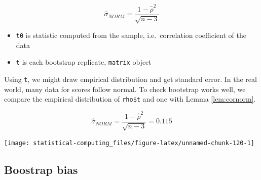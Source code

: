 \documentclass[]{book}
\newenvironment{Shaded}{\begin{snugshade}}{\end{snugshade}}
\newcommand{\CommentTok}[1]{\textcolor[rgb]{0.56,0.35,0.01}{\textit{#1}}}
\newcommand{\DataTypeTok}[1]{\textcolor[rgb]{0.13,0.29,0.53}{#1}}
\newcommand{\DecValTok}[1]{\textcolor[rgb]{0.00,0.00,0.81}{#1}}
\newcommand{\KeywordTok}[1]{\textcolor[rgb]{0.13,0.29,0.53}{\textbf{#1}}}
\newcommand{\NormalTok}[1]{#1}
\newcommand{\OperatorTok}[1]{\textcolor[rgb]{0.81,0.36,0.00}{\textbf{#1}}}
\newcommand{\StringTok}[1]{\textcolor[rgb]{0.31,0.60,0.02}{#1}}
\providecommand{\tightlist}{%
  \setlength{\itemsep}{0pt}\setlength{\parskip}{0pt}}
\theoremstyle{definition}
\theoremstyle{definition}
\theoremstyle{definition}
\theoremstyle{remark}
\begin{document}
\[\hat\sigma_{NORM} = \frac{1 - \hat\rho^2}{\sqrt{n - 3}}\]

\begin{itemize}
\tightlist
\item
  \texttt{t0} is statistic computed from the sample, i.e.~correlation coefficient of the data
\item
  \texttt{t} is each bootstrap replicate, \texttt{matrix} object
\end{itemize}

Using \texttt{t}, we might draw empirical distribution and get standard error. In the real world, many data for scores follow normal. To check bootstrap works well, we compare the empirical distribution of \texttt{rho\$t} and one with Lemma \ref{lem:cornorm}.

\[\hat\sigma_{NORM} = \frac{1 - \hat\rho^2}{\sqrt{n - 3}} = 0.115\]

\begin{Shaded}
\end{Shaded}

\begin{center}\texttt{[image: statistical-computing\_files/figure-latex/unnamed-chunk-120-1]} \end{center}

\hypertarget{boostrap-bias}{%
\subsection{Boostrap bias}\label{boostrap-bias}}


\end{document}
